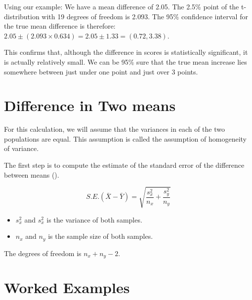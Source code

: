 Using our example:
We have a mean difference of 2.05. The 2.5\% point of the t-distribution with 19 degrees
of freedom is 2.093. The 95\% confidence interval for the true mean difference is therefore:
$2.05 \pm (2.093 \times 0.634) = 2.05 \pm 1.33 = (0.72, 3.38)$.

This confirms that, although the difference in scores is statistically significant, it is actually
relatively small. We can be 95\% sure that the true mean increase lies somewhere between
just under one point and just over 3 points.










\section{Difference in Two means}
For this calculation, we will assume that the variances in each of the two populations are equal. This assumption is called the assumption of homogeneity of variance.

The first step is to compute the estimate of the standard error of the difference between means ().

\[ S.E.(\bar{X}-\bar{Y}) = \sqrt{\frac{s^2_x}{n_x} + \frac{s^2_y}{n_y}} \]

\begin{itemize}
\item $s^2_x$ and $s^2_x$ is the variance of both samples.
\item $n_x$ and $n_y$ is the sample size of both samples.
\end{itemize}
The degrees of freedom is $n_x + n_y -2$.




%
%
%
%





\section{Worked Examples} 

